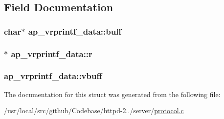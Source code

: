 \subsection{Field Documentation}
\subsubsection[{\texorpdfstring{buff}{buff}}]{\setlength{\rightskip}{0pt plus 5cm}char$\ast$ ap\+\_\+vrprintf\+\_\+data\+::buff}\hypertarget{structap__vrprintf__data_abc9985e5c40187c49a0698ffbf61de07}{}\label{structap__vrprintf__data_abc9985e5c40187c49a0698ffbf61de07}
\subsubsection[{\texorpdfstring{r}{r}}]{$\ast$ ap\+\_\+vrprintf\+\_\+data\+::r}\hypertarget{structap__vrprintf__data_aa9772c8fd73d66ad86d98fa8dd578ce2}{}\label{structap__vrprintf__data_aa9772c8fd73d66ad86d98fa8dd578ce2}
\subsubsection[{\texorpdfstring{vbuff}{vbuff}}]{ ap\+\_\+vrprintf\+\_\+data\+::vbuff}\hypertarget{structap__vrprintf__data_a1a17c5920b17a91c110cb3d634366693}{}\label{structap__vrprintf__data_a1a17c5920b17a91c110cb3d634366693}


The documentation for this struct was generated from the following file\+:\begin{DoxyCompactItemize}
\item 
/usr/local/src/github/\+Codebase/httpd-\/2../server/\hyperlink{protocol_8c}{protocol.\+c}\end{DoxyCompactItemize}
